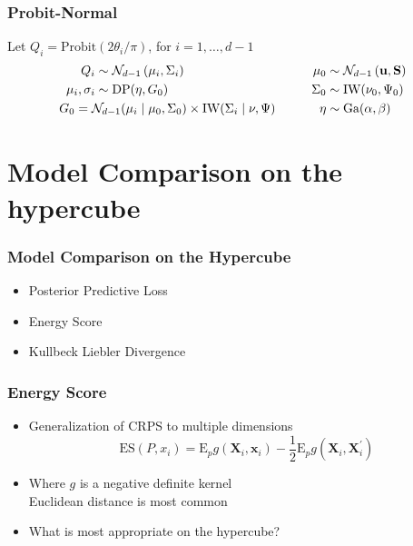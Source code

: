 \documentclass[aspectratio=169]{beamer}
\begin{document}
\begin{frame}
  \frametitle{Probit-Normal}
  Let $Q_i = \text{Probit}(2\theta_i / \pi)$, for $i = 1,\ldots,d-1$
  \begin{equation*}
    \begin{aligned}
                Q_i &\sim \mathcal{N}_{d-1}\left(\mu_i, \Sigma_i\right)\\
    \mu_i, \sigma_i &\sim \text{DP}(\eta, G_0)\\
                    &\hspace{-1cm}G_0 =
                      \mathcal{N}_{d-1}(\mu_i\mid\mu_0,\Sigma_0)\times \text{IW}(\Sigma_i\mid\nu,\Psi)
    \end{aligned}
    \hspace{1cm}
    \begin{aligned}
              \mu_0 &\sim \mathcal{N}_{d-1}\left({\bf u},{\bf S}\right)\\
           \Sigma_0 &\sim \text{IW}(\nu_0,\Psi_0)\\
               \eta &\sim \text{Ga}(\alpha, \beta)
    \end{aligned}
  \end{equation*}
\end{frame}

\section{Model Comparison on the hypercube}

\begin{frame}
  \frametitle{Model Comparison on the Hypercube}
  \begin{itemize}
    \item Posterior Predictive Loss
    \item Energy Score
    \item Kullbeck Liebler Divergence
  \end{itemize}
\end{frame}

\begin{frame}
  \frametitle{Energy Score}
  \begin{itemize}
    \item Generalization of CRPS to multiple dimensions
    \begin{equation}
      \label{eq:es}
      \text{ES}\left(P,x_i\right) =  \text{E}_p g\left(\bm{X}_i, \bm{x}_i\right)
                - \frac{1}{2}\text{E}_p g\left(\bm{X}_i,\bm{X}_i^{\prime}\right)
    \end{equation}
    \pause
    \item Where $g$ is a negative definite kernel\\
      Euclidean distance is most common
    \pause
    \item What is most appropriate on the hypercube?
  \end{itemize}
\end{frame}
\end{document}
